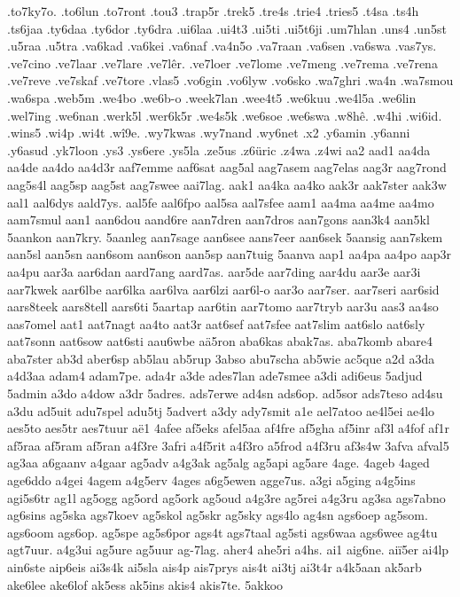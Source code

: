 {.to7ky7o.
.to6lun
.to7ront
.tou3
.trap5r
.trek5
.tre4s
.trie4
.tries5
.t4sa
.ts4h
.ts6jaa
.ty6daa
.ty6dor
.ty6dra
.ui6laa
.ui4t3
.ui5ti
.ui5t6ji
.um7hlan
.uns4
.un5st
.u5raa
.u5tra
.va6kad
.va6kei
.va6naf
.va4n5o
.va7raan
.va6sen
.va6swa
.vas7ys.
.ve7cino
.ve7laar
.ve7lare
.ve7lêr.
.ve7loer
.ve7lome
.ve7meng
.ve7rema
.ve7rena
.ve7reve
.ve7skaf
.ve7tore
.vlas5
.vo6gin
.vo6lyw
.vo6sko
.wa7ghri
.wa4n
.wa7smou
.wa6spa
.web5m
.we4bo
.we6b-o
.week7lan
.wee4t5
.we6kuu
.we4l5a
.we6lin
.wel7ing
.we6nan
.werk5l
.wer6k5r
.we4s5k
.we6soe
.we6swa
.w8hê.
.w4hi
.wi6id.
.wins5
.wi4p
.wi4t
.wî9e.
.wy7kwas
.wy7nand
.wy6net
.x2
.y6amin
.y6anni
.y6asud
.yk7loon
.ys3
.ys6ere
.ys5la
.ze5us
.z6üric
.z4wa
.z4wi
aa2
aad1
aa4da
aa4de
aa4do
aa4d3r
aaf7emme
aaf6sat
aag5al
aag7asem
aag7elas
aag3r
aag7rond
aag5s4l
aag5sp
aag5st
aag7swee
aai7lag.
aak1
aa4ka
aa4ko
aak3r
aak7ster
aak3w
aal1
aal6dys
aald7ys.
aal5fe
aal6fpo
aal5sa
aal7sfee
aam1
aa4ma
aa4me
aa4mo
aam7smul
aan1
aan6dou
aand6re
aan7dren
aan7dros
aan7gons
aan3k4
aan5kl
5aankon
aan7kry.
5aanleg
aan7sage
aan6see
aans7eer
aan6sek
5aansig
aan7skem
aan5sl
aan5sn
aan6som
aan6son
aan5sp
aan7tuig
5aanva
aap1
aa4pa
aa4po
aap3r
aa4pu
aar3a
aar6dan
aard7ang
aard7as.
aar5de
aar7ding
aar4du
aar3e
aar3i
aar7kwek
aar6lbe
aar6lka
aar6lva
aar6lzi
aar6l-o
aar3o
aar7ser.
aar7seri
aar6sid
aars8teek
aars8tell
aars6ti
5aartap
aar6tin
aar7tomo
aar7tryb
aar3u
aas3
aa4so
aas7omel
aat1
aat7nagt
aa4to
aat3r
aat6sef
aat7sfee
aat7slim
aat6slo
aat6sly
aat7sonn
aat6sow
aat6sti
aau6wbe
aä5ron
aba6kas
abak7as.
aba7komb
abare4
aba7ster
ab3d
aber6sp
ab5lau
ab5rup
3abso
abu7scha
ab5wie
ac5que
a2d
a3da
a4d3aa
adam4
adam7pe.
ada4r
a3de
ades7lan
ade7smee
a3di
adi6eus
5adjud
5admin
a3do
a4dow
a3dr
5adres.
ads7erwe
ad4sn
ads6op.
ad5sor
ads7teso
ad4su
a3du
ad5uit
adu7spel
adu5tj
5advert
a3dy
ady7smit
a1e
ael7atoo
ae4l5ei
ae4lo
aes5to
aes5tr
aes7tuur
aë1
4afee
af5eks
afel5aa
af4fre
af5gha
af5inr
af3l
a4fof
af1r
af5raa
af5ram
af5ran
a4f3re
3afri
a4f5rit
a4f3ro
a5frod
a4f3ru
af3s4w
3afva
afval5
ag3aa
a6gaanv
a4gaar
ag5adv
a4g3ak
ag5alg
ag5api
ag5are
4age.
4ageb
4aged
age6ddo
a4gei
4agem
a4g5erv
4ages
a6g5ewen
agge7us.
a3gi
a5ging
a4g5ins
agi5s6tr
ag1l
ag5ogg
ag5ord
ag5ork
ag5oud
a4g3re
ag5rei
a4g3ru
ag3sa
ags7abno
ag6sins
ag5ska
ags7koev
ag5skol
ag5skr
ag5sky
ags4lo
ag4sn
ags6oep
ag5som.
ags6oom
ags6op.
ag5spe
ag5s6por
ags4t
ags7taal
ag5sti
ags6waa
ags6wee
ag4tu
agt7uur.
a4g3ui
ag5ure
ag5uur
ag-7lag.
aher4
ahe5ri
a4hs.
ai1
aig6ne.
aiï5er
ai4lp
ain6ste
aip6eis
ai3s4k
ai5sla
ais4p
ais7prys
ais4t
ai3tj
ai3t4r
a4k5aan
ak5arb
ake6lee
ake6lof
ak5ess
ak5ins
akis4
akis7te.
5akkoo
}
